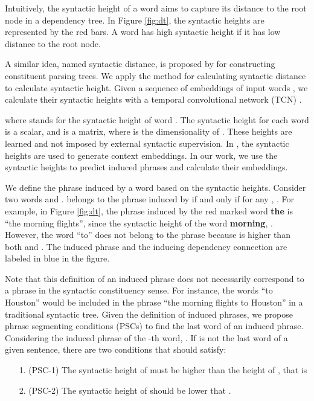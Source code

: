 \documentclass[11pt,a4paper]{article}
\begin{document}
Intuitively, the syntactic height of a word aims to capture its distance to the root node in a dependency tree. In Figure \ref{fig:dt}, the syntactic heights are represented by the red bars. A word has high syntactic height if it has low distance to the root node.

A similar idea, named syntactic distance, is proposed by \citet{shen2017neural} for constructing constituent parsing trees. We apply the method for calculating syntactic distance to calculate syntactic height. Given a sequence of embeddings of input words , we calculate their syntactic heights with a temporal convolutional network (TCN) \cite{bai2018empirical}. 


where  stands for the syntactic height of word . The syntactic height  for each word is a scalar, and  is a  matrix, where  is the dimensionality of . These heights are learned and not imposed by external syntactic supervision. 
In \citet{shen2017neural}, the syntactic heights are used to generate context embeddings. In our work, we use the syntactic heights to predict induced phrases and calculate their embeddings.

We define the phrase induced by a word based on the syntactic heights. Consider two words  and .  belongs to the phrase induced by  if and only if for any , . For example, in Figure \ref{fig:dt}, the phrase induced by the red marked word \textbf{the} is ``the morning flights'', since the syntactic height of the word \textbf{morning}, . However, the word ``to'' does not belong to the phrase because  is higher than both  and . The induced phrase and the inducing dependency connection are labeled in blue in the figure.

Note that this definition of an induced phrase does not necessarily correspond to a phrase in the syntactic constituency sense. For instance, the words ``to Houston'' would be included in the phrase ``the morning flights to Houston'' in a traditional syntactic tree. Given the definition of induced phrases, we propose phrase segmenting conditions (PSCs) to find the last word of an induced phrase. Considering the induced phrase of the -th word, . If  is not the last word of a given sentence, there are two conditions that  should satisfy:
\begin{itemize}
\item[1.] (PSC-1) The syntactic height of  must be higher than the height of , that is

\item[2.] (PSC-2) The syntactic height of  should be lower that .

\end{itemize}
\end{document}
